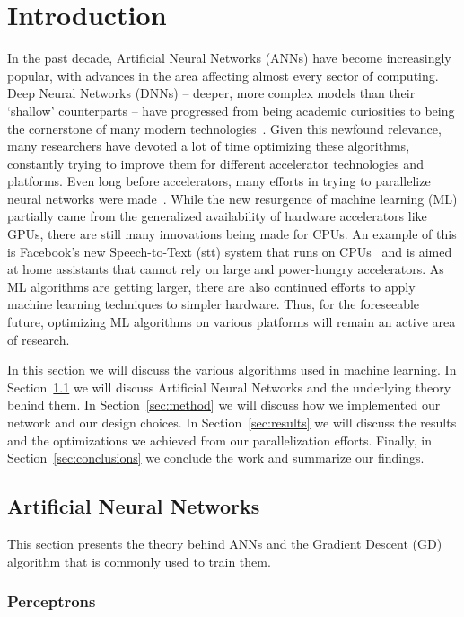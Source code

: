 \section{Introduction} 
%
In the past decade, Artificial Neural Networks (ANNs) have become increasingly
popular, with advances in the area affecting almost every sector of computing.
Deep Neural Networks (DNNs) \--- deeper, more complex models than their
`shallow' counterparts \--- have progressed from being academic curiosities to
being the cornerstone of many modern technologies~\cite{deep_learning_overview}.  Given this newfound
relevance, many researchers have devoted a lot of time optimizing these
algorithms, constantly trying to improve them for different accelerator
technologies and platforms. Even long before accelerators, many efforts in
trying to parallelize neural networks were made~\cite{10.1007/BFb0024235}.
While the new resurgence of machine learning (ML) partially came from the
generalized availability of hardware accelerators like GPUs, there are still
many innovations being made for CPUs. An example of this is Facebook's new
Speech-to-Text (stt) system that runs on CPUs~\cite{fbcpu} and is aimed at home
assistants that cannot rely on large and power-hungry accelerators.  As ML
algorithms are getting larger, there are also continued efforts to apply machine
learning techniques to simpler hardware. Thus, for the foreseeable future,
optimizing ML algorithms on various platforms will remain an active area of
research.

In this section we will discuss the various algorithms used in machine learning.
In Section~\ref{sec:ann} we will discuss Artificial Neural Networks and the
underlying theory behind them. In Section~\ref{sec:method} we will discuss how
we implemented our network and our design choices. In Section~\ref{sec:results}
we will discuss the results and the optimizations we achieved from our
parallelization efforts. Finally, in Section~\ref{sec:conclusions} we conclude
the work and summarize our findings.

\subsection{Artificial Neural Networks}\label{sec:ann}

This section presents the theory behind ANNs and the Gradient Descent (GD)
algorithm that is commonly used to train them.

\subsubsection{Perceptrons}

